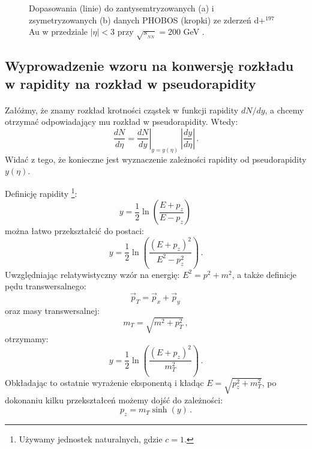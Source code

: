 \documentclass[a4paper,12pt]{article}
\begin{document}
\begin{figure}[H]
\begin{center}
%
\hspace{0.5cm}
%
\caption{Dopasowania (linie) do zantysemtryzowanych (a) i zsymetryzowanych (b) danych PHOBOS (kropki) ze zderzeń d+$^{197}$Au w przedziale $|\eta| < 3$ przy $\sqrt{s_{_{NN}}}=200$ GeV \cite{Back:2004mr}.}\label{fig:Nmp}
\end{center}
\end{figure}


\subsection{Wyprowadzenie wzoru na konwersję rozkładu w rapidity na rozkład w pseudorapidity}
\paragraph{}
Załóżmy, że znamy rozkład krotności cząstek w funkcji rapidity $dN/dy$, a chcemy otrzymać odpowiadający mu rozkład w pseudorapidity. Wtedy:
\begin{equation}\label{eq:conversion-y-eta}
 \frac{dN}{d\eta} = \left. \frac{dN}{dy} \right|_{y = y(\eta)} \: \left| \frac{dy}{d\eta} \right|\,.
\end{equation}
Widać z tego, że konieczne jest wyznaczenie zależności rapidity od pseudorapidity $y(\eta)$.

Definicję rapidity \footnote{Używamy jednostek naturalnych, gdzie $c=1$.}:
\begin{equation} \label{eq:rapid}
y = \frac{1}{2} \ln \left( \frac{E + p_z}{E - p_z} \right)\,
\end{equation}
można łatwo przekształcić do postaci:
\begin{equation} \label{eq:rapid1}
y = \frac{1}{2} \ln \left( \frac{(E + p_z)^2}{E^2 - p_z^2} \right)\,.
\end{equation}
Uwzględniając relatywistyczny wzór na energię: $E^2 = p^2 + m^2$, a także definicje pędu transwersalnego:
\begin{equation} \label{eq:pt}
\vec{p}_T = \vec{p}_x + \vec{p}_y \,
\end{equation}
oraz masy transwersalnej:
\begin{equation} \label{eq:mt}
m_T = \sqrt{m^2 + p_T^2} \,,
\end{equation}
otrzymamy:
\begin{equation} \label{eq:rapid2}
y = \frac{1}{2} \ln \left( \frac{(E + p_z)^2}{m_T^2} \right)\,.
\end{equation}
Obkładając to ostatnie wyrażenie eksponentą i kładąc $E = \sqrt{p_z^2 + m_T^2}$, po dokonaniu kilku przekształceń możemy dojść do zależności:
\begin{equation} \label{eq:pz-rapid}
p_z = m_{T} \sinh(y)\,.
\end{equation}
\end{document}
